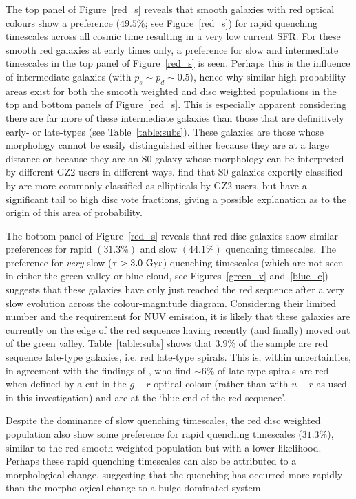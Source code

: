 The top panel of Figure~\ref{red_s} reveals that smooth galaxies with red optical colours show a preference $(49.5\%$; see Figure~\ref{red_s}) for rapid quenching timescales across all cosmic time resulting in a very low current SFR. For these smooth red galaxies at early times only, a preference for slow and intermediate timescales in the top panel of Figure~\ref{red_s} is seen. Perhaps this is the influence of intermediate galaxies (with $p_s \sim p_d \sim 0.5$), hence why similar high probability areas exist for both the smooth weighted and disc weighted populations in the top and bottom panels of Figure~\ref{red_s}. This is especially apparent considering there are far more of these intermediate galaxies than those that are definitively early- or late-types (see Table~\ref{table:subs}). These galaxies are those whose morphology cannot be easily distinguished either because they are at a large distance or because they are an S0 galaxy whose morphology can be interpreted by different GZ2 users in different ways. \citet{GZ2} find that S0 galaxies expertly classified by \citet{nair10} are more commonly classified as ellipticals by GZ2 users, but have a significant tail to high disc vote fractions, giving a possible explanation as to the origin of this area of probability.

The bottom panel of Figure~\ref{red_s} reveals that red disc galaxies show similar preferences for rapid $(31.3\%)$ and slow $(44.1\%)$ quenching timescales. The preference for \emph{very} slow ($\tau > 3.0 ~\rm{Gyr}$) quenching timescales (which are not seen in either the green valley or blue cloud, see Figures~\ref{green_v} and~\ref{blue_c}) suggests that these  galaxies have only just reached the red sequence after a very slow evolution across the colour-magnitude diagram. Considering their limited number and the requirement for NUV emission, it is likely that these galaxies are currently on the edge of the red sequence having recently (and finally) moved out of the green valley. Table~\ref{table:subs} shows that $3.9\%$ of the sample are red sequence late-type galaxies, i.e. red late-type spirals. This is, within uncertainties, in agreement with the findings of \citet{masters10c}, who find $\sim6\%$ of late-type spirals are red when defined by a cut in the $g-r$ optical colour (rather than with $u-r$ as used in this investigation) and are at the `blue end of the red sequence'. 

Despite the dominance of slow quenching timescales, the red disc weighted population also show some preference for rapid quenching timescales ($31.3\%$), similar to the red smooth weighted population but with a lower likelihood. Perhaps these rapid quenching timescales can also be attributed to a morphological change, suggesting that the quenching has occurred more rapidly than the morphological change to a bulge dominated system.

